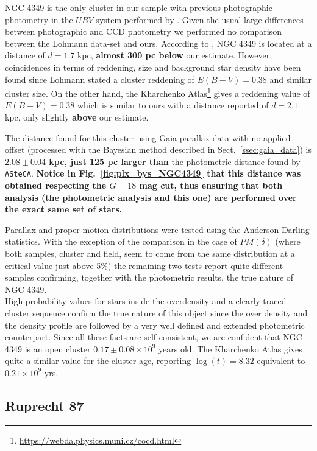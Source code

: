 \documentclass[referee]{aa}
\begin{document}
NGC 4349 is the only cluster in our sample with previous photographic photometry
in the $UBV$ system performed by \cite{Lohmann_1961}. Given the usual large
differences between photographic and CCD photometry we performed no comparison
between the Lohmann data-set and ours. According to \cite{Lohmann_1961}, NGC
4349 is located at a distance of $d=1.7$ kpc, \textbf{almost 300 pc below}
our estimate.
However, coincidences in terms of reddening, size and background star density
have been found since Lohmann stated a cluster reddening of $E(B-V)=0.38$
and similar cluster size. On the other hand, the Kharchenko
Atlas\footnote{\url{https://webda.physics.muni.cz/cocd.html}}
\citep{Kharchenko_2005} gives a reddening value of $E(B-V)=0.38$ which is
similar to ours with a distance reported of $d=2.1$ kpc, only slightly
\textbf{above} our estimate.

The distance found for this cluster using Gaia parallax data with no applied
offset (processed with the Bayesian method described in
Sect.~\ref{ssec:gaia_data}) is \textbf{$2.08\pm0.04$ kpc, just 125 pc
larger than} the photometric distance found by \texttt{ASteCA}.
\textbf{Notice in Fig.~\ref{fig:plx_bys_NGC4349} that this distance was
obtained respecting the $G=18$ mag cut, thus ensuring that both analysis (the
photometric analysis and this one) are performed over the exact same set of
stars.}

Parallax and proper motion distributions were tested using the Anderson-Darling
statistics. With the exception of the comparison in the case of $PM(\delta)$
(where both samples, cluster and field, seem to come from the same distribution
at a critical value just above 5\%) the remaining two tests report quite
different samples confirming, together with the photometric results, the true
nature of NGC 4349.\\

High probability values for stars inside the overdensity and a clearly traced
cluster sequence confirm the true nature of this object since the over density
and the density profile are followed by a very well defined and extended
photometric counterpart.
Since all these facts are self-consistent, we are confident that NGC 4349 is
an open cluster $0.17\pm0.08\times10^9$ years old.
The Kharchenko Atlas gives quite a similar value for the cluster age, reporting
$\log(t)=8.32$ equivalent to $0.21\times10^9$ yrs.




\subsection{Ruprecht 87}
\end{document}
